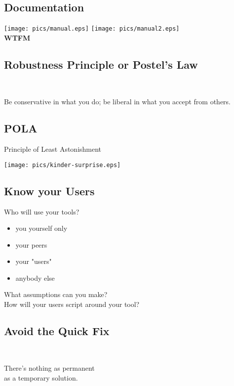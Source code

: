 \documentclass[xga]{xdvislides}
\begin{document}
\subsection{Documentation}
\vspace*{\fill}
\begin{center}
	\texttt{[image: pics/manual.eps]}
	\hspace{.5in}
	\texttt{[image: pics/manual2.eps]}
	\\
	\vspace{.2in}
	\Huge
	{\bf WTFM}
	\Normalsize
\end{center}
\vspace*{\fill}

\subsection{Robustness Principle or Postel's Law}
\\
\Huge
\begin{center}
	Be conservative in what you do; be liberal in what you accept from others.
\end{center}
\Normalsize


\subsection{POLA}
Principle of Least Astonishment
\\
\vspace*{\fill}
\begin{center}
	\texttt{[image: pics/kinder-surprise.eps]}
\end{center}
\vspace*{\fill}

\subsection{Know your Users}
Who will use your tools?
\begin{itemize}
	\item you yourself only
	\item your peers
	\item your "users"
	\item anybody else
\end{itemize}
\vspace{.5in}
What assumptions can you make? \\
How will your users script around your tool?

\subsection{Avoid the Quick Fix}
\\
\Huge
\begin{center}
There's nothing as permanent \\
as a temporary solution.
\end{center}
\Normalsize
\end{document}
